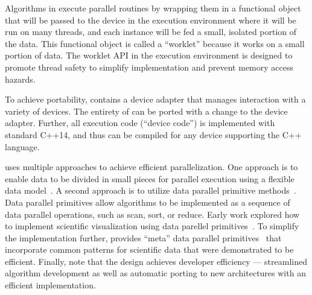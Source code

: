 Algorithms in \vtkm execute parallel routines by wrapping them in a functional object that will be passed to the device in the execution environment where it will be run on many threads, and each instance will be fed a small, isolated portion of the data.
This functional object is called a ``worklet'' because it works on a small portion of data.
The worklet API in the execution environment is designed to promote thread safety to simplify implementation and prevent memory access hazards.


To achieve portability, \vtkm contains a device adapter that manages interaction with a variety of devices.
The entirety of \vtkm can be ported with a change to the device adapter.
%
Further, all execution code (``device code'') is implemented with standard C++14,
and thus can be compiled for any device supporting the C++ language.

\vtkm uses multiple approaches to achieve efficient parallelization.
One approach is 
to enable data to be divided in small pieces for parallel execution
using a 
flexible data model~\cite{Meredith2012}.
A second approach is 
to utilize
data parallel primitive methods~\cite{Blelloch1990}.
Data parallel primitives allow algorithms to be implemented as a sequence of data parallel operations, such as scan, sort, or reduce.
Early work explored how to implement scientific visualization using data parellel primitives~\cite{Lo2012}.
To simplify the implementation further, \vtkm provides ``meta'' data parallel primitives~\cite{Moreland2021} that incorporate common patterns for scientific data that were demonstrated to be efficient.
Finally, note that the \vtkm design achieves developer efficiency --- 
streamlined algorithm development as well as 
automatic
porting to new architectures with an efficient implementation.
